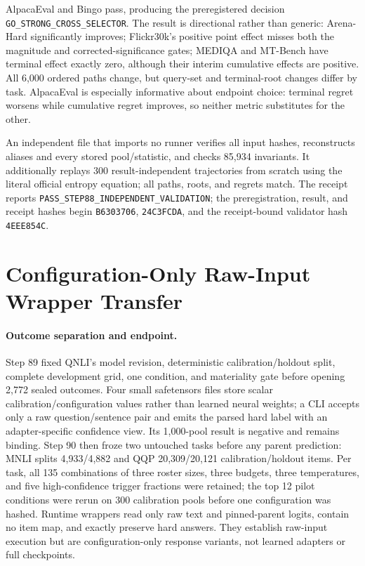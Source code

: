 

AlpacaEval and Bingo pass, producing the preregistered decision \texttt{GO\_STRONG\_CROSS\_SELECTOR}. The result is directional rather than generic: Arena-Hard significantly improves; Flickr30k's positive point effect misses both the magnitude and corrected-significance gates; MEDIQA and MT-Bench have terminal effect exactly zero, although their interim cumulative effects are positive. All 6,000 ordered paths change, but query-set and terminal-root changes differ by task. AlpacaEval is especially informative about endpoint choice: terminal regret worsens while cumulative regret improves, so neither metric substitutes for the other.

An independent file that imports no runner verifies all input hashes, reconstructs aliases and every stored pool/statistic, and checks 85,934 invariants. It additionally replays 300 result-independent trajectories from scratch using the literal official entropy equation; all paths, roots, and regrets match. The receipt reports \texttt{PASS\_STEP88\_INDEPENDENT\_VALIDATION}; the preregistration, result, and receipt hashes begin \texttt{B6303706}, \texttt{24C3FCDA}, and the receipt-bound validator hash \texttt{4EEE854C}.

\section{Configuration-Only Raw-Input Wrapper Transfer}
\label{app:step90}

\paragraph{Outcome separation and endpoint.}
Step 89 fixed QNLI's model revision, deterministic calibration/holdout split, complete development grid, one condition, and materiality gate before opening 2,772 sealed outcomes. Four small safetensors files store scalar calibration/configuration values rather than learned neural weights; a CLI accepts only a raw question/sentence pair and emits the parsed hard label with an adapter-specific confidence view. Its 1,000-pool result is negative and remains binding. Step 90 then froze two untouched tasks before any parent prediction: MNLI splits 4,933/4,882 and QQP 20,309/20,121 calibration/holdout items. Per task, all 135 combinations of three roster sizes, three budgets, three temperatures, and five high-confidence trigger fractions were retained; the top 12 pilot conditions were rerun on 300 calibration pools before one configuration was hashed. Runtime wrappers read only raw text and pinned-parent logits, contain no item map, and exactly preserve hard answers. They establish raw-input execution but are configuration-only response variants, not learned adapters or full checkpoints.


